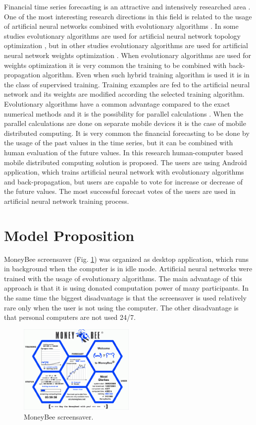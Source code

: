 \documentclass[11pt]{article}
\begin{document}
Financial time series forecasting is an attractive and intensively researched area \cite{nava01}. One of the most interesting research directions in this field is related to the usage of artificial neural networks combined with evolutionary algorithms \cite{zhang01}. In some studies evolutionary algorithms are used for artificial neural network topology optimization \cite{kapanova01}, but in other studies evolutionary algorithms are used for artificial neural network weights optimization \cite{aljarah01}. When evolutionary algorithms are used for weights optimization it is very common the training to be combined with back-propagation algorithm. Even when such hybrid training algorithm is used it is in the class of supervised training. Training examples are fed to the artificial neural network and its weights are modified according the selected training algorithm. Evolutionary algorithms have a common advantage compared to the exact numerical methods and it is the possibility for parallel calculations \cite{altinoz01}. When the parallel calculations are done on separate mobile devices it is the case of mobile distributed computing. It is very common the financial forecasting to be done by the usage of the past values in the time series, but it can be combined with human evaluation of the future values. In this research human-computer based mobile distributed computing solution is proposed. The users are using Android application, which trains artificial neural network with evolutionary algorithms and back-propagation, but users are capable to vote for increase or decrease of the future values. The most successful forecast votes of the users are used in artificial neural network training process.

\section{Model Proposition} \label{Model Proposition}

MoneyBee screensaver (Fig. \ref{fig01}) was organized as desktop application, which runs in background when the computer is in idle mode. Artificial neural networks were trained with the usage of evolutionary algorithms. The main advantage of this approach is that it is using donated computation power of many participants. In the same time the biggest disadvantage is that the screensaver is used relatively rare only when the user is not using the computer. The other disadvantage is that personal computers are not used 24/7.

\begin{figure}
\includegraphics[width=0.5\textwidth]{fig01.png}
\centering
\caption{MoneyBee screensaver.} \label{fig01}
\end{figure}
\FloatBarrier
\end{document}
